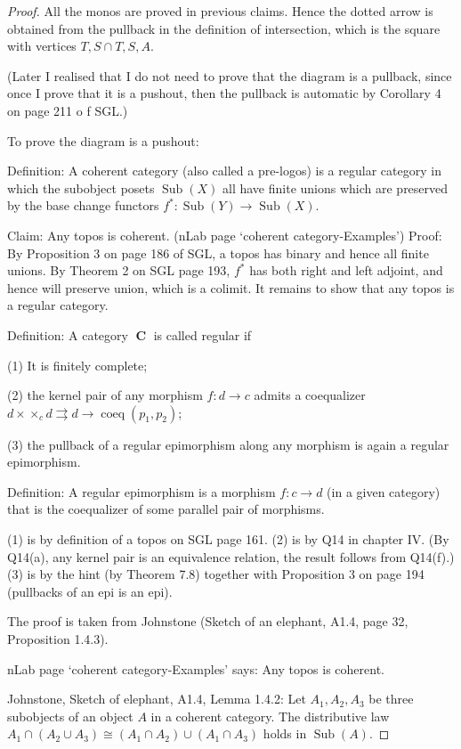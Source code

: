 \documentclass[a4paper]{article}
\DeclareMathOperator{\C}{\mathbf {C}}
\DeclareMathOperator{\Sub}{\text {Sub}}
\DeclareMathOperator{\coeq}{\text {coeq}}
\begin{document}
\begin{proof}
    All the monos are proved in previous claims. Hence the dotted arrow is obtained from the pullback in the definition of intersection, which is the square with vertices $T,S\cap T, S, A$. 
    
    (Later I realised that I do not need to prove that the diagram is a pullback, since once I prove that it is a pushout, then the pullback is automatic by Corollary 4 on page 211 o f SGL.)

    To prove the diagram is a pushout:

    Definition: A coherent category (also called a pre-logos) is a regular category in which the subobject posets $\Sub(X)$ all have finite unions which are preserved by the base change functors $f^*:\Sub(Y)\to \Sub(X)$.

    Claim: Any topos is coherent. (nLab page `coherent category-Examples')
    Proof: By Proposition 3 on page 186 of SGL, a topos has binary and hence all finite unions. By Theorem 2 on SGL page 193, $f^*$ has both right and left adjoint, and hence will preserve union, which is a colimit. It remains to show that any topos is a regular category.

    Definition: A category $\C$ is called regular if

    (1) It is finitely complete;
    
    (2) the kernel pair of any morphism $f:d\to c$ admits a coequalizer $d×\times_cd\rightrightarrows d\to \coeq(p_1,p_2)$;
    
    (3) the pullback of a regular epimorphism along any morphism is again a regular epimorphism.

    Definition: A regular epimorphism is a morphism $f:c\to d$ (in a given category) that is the coequalizer of some parallel pair of morphisms.

    (1) is by definition of a topos on SGL page 161. (2) is by Q14 in chapter IV. (By Q14(a), any kernel pair is an equivalence relation, the result follows from Q14(f).) (3) is by the hint (by Theorem 7.8) together with Proposition 3 on page 194 (pullbacks of an epi is an epi).

    

    The proof is taken from Johnstone (Sketch of an elephant, A1.4, page 32, Proposition 1.4.3).

    nLab page `coherent category-Examples' says: Any topos is coherent.


    Johnstone, Sketch of elephant, A1.4, Lemma 1.4.2: Let $A_1,A_2,A_3$ be three subobjects of an object $A$ in a coherent category. The distributive law $A_1\cap (A_2\cup A_3)\cong (A_1\cap A_2)\cup (A_1\cap A_3)$ holds in $\Sub(A)$.


\end{proof}
\end{document}
